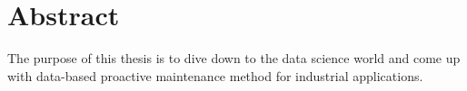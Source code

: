 \chapter*{Abstract}

The purpose of this thesis is to dive down to the data science world and come up with data-based proactive maintenance method for industrial applications.
